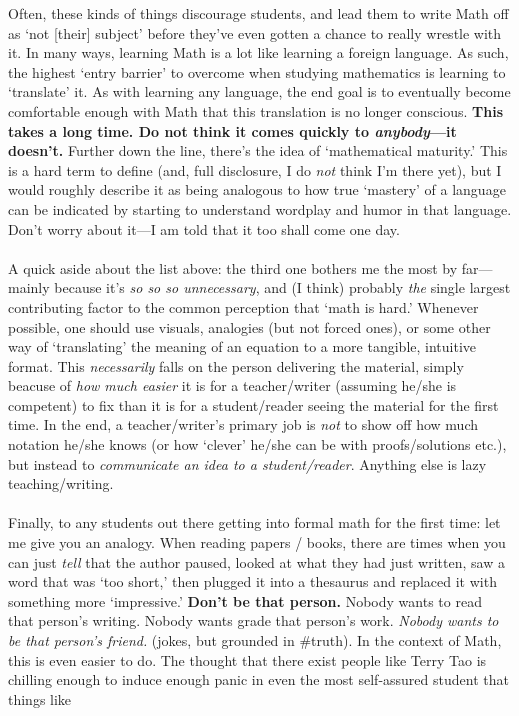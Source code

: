 \documentclass[10pt]{article}
\theoremstyle{definition}
\begin{document}
Often, these kinds of things discourage students, and lead them to write Math off as `not [their] subject' before they've even gotten a chance to really wrestle with it.  In many ways, learning Math is a lot like learning a foreign language.  As such, the highest `entry barrier' to overcome when studying mathematics is learning to `translate' it.  As with learning any language, the end goal is to eventually become comfortable enough with Math that this translation is no longer conscious.  \textbf{This takes a long time.  Do not think it comes quickly to \emph{anybody}---it doesn't.}  Further down the line, there's the idea of `mathematical maturity.'  This is a hard term to define (and, full disclosure, I do \emph{not} think I'm there yet), but I would roughly describe it as being analogous to how true `mastery' of a language can be indicated by starting to understand wordplay and humor in that language.  Don't worry about it---I am told that it too shall come one day.\\~\\
A quick aside about the list above: the third one bothers me the most by far---mainly because it's \emph{so so so unnecessary}, and (I think) probably \emph{the} single largest contributing factor to the common perception that `math is hard.'  Whenever possible, one should use visuals, analogies (but not forced ones), or some other way of `translating' the meaning of an equation to a more tangible, intuitive format.  This \emph{necessarily} falls on the person delivering the material, simply beacuse of \emph{how much easier} it is for a teacher/writer (assuming he/she is competent) to fix than it is for a student/reader seeing the material for the first time.  In the end, a teacher/writer's primary job is \emph{not} to show off how much notation he/she knows (or how `clever' he/she can be with proofs/solutions etc.), but instead to \emph{communicate an idea to a student/reader}.  Anything else is lazy teaching/writing.  \\~\\
Finally, to any students out there getting into formal math for the first time: let me give you an analogy.  When reading papers / books, there are times when you can just \emph{tell} that the author paused, looked at what they had just written, saw a word that was `too short,' then plugged it into a thesaurus and replaced it with something more `impressive.'  \textbf{Don't be that person.}  Nobody wants to read that person's writing.  Nobody wants grade that person's work.  \emph{Nobody wants to be that person's friend.} (jokes, but grounded in \#truth).  In the context of Math, this is even easier to do.  The thought that there exist people like Terry Tao is chilling enough to induce enough panic in even the most self-assured student that things like
\end{document}
